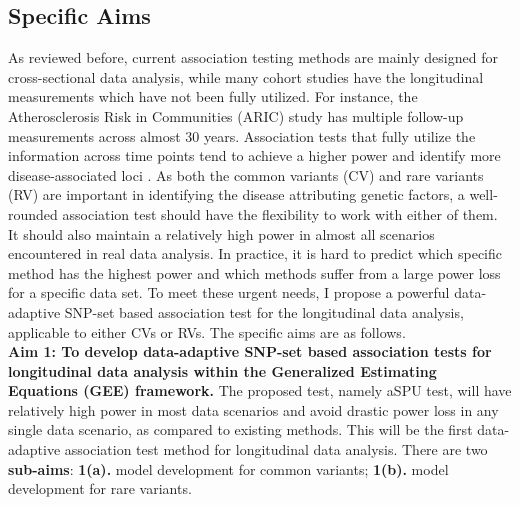 \documentclass[12pt]{article}
\begin{document}
\subsection{Specific Aims}\label{sec:aims}
As reviewed before, current association testing methods are mainly designed for cross-sectional data analysis, while many cohort studies have the longitudinal measurements which have not been fully utilized. For instance, the Atherosclerosis Risk in Communities (ARIC) study \cite{Heiss1989} has multiple follow-up measurements across almost 30 years. Association tests that fully utilize the information across time points tend to achieve a higher power and identify more disease-associated loci \cite{Furlotte2012,Xu2014}. As both the common variants (CV) and rare variants (RV) are important in identifying the disease attributing genetic factors, a well-rounded association test should have the flexibility to work with either of them. It should also maintain a relatively high power in almost all scenarios encountered in real data analysis. In practice, it is hard to predict which specific method has the highest power and which methods suffer from a large power loss for a specific data set. To meet these urgent needs, I propose a powerful data-adaptive SNP-set based association test for the longitudinal data analysis, applicable to either CVs or RVs. The specific aims are as follows.\\
\textbf{Aim 1: To develop data-adaptive SNP-set based association tests for longitudinal data analysis within the Generalized Estimating Equations (GEE) framework.}
The proposed test, namely aSPU test, will have relatively high power in most data scenarios and avoid drastic power loss in any single data scenario, as compared to existing methods. This will be the first data-adaptive association test method for longitudinal data analysis. There are two \textbf{sub-aims}: \textbf{1(a).} model development for common variants; \textbf{1(b).} model development for rare variants. %
\end{document}
